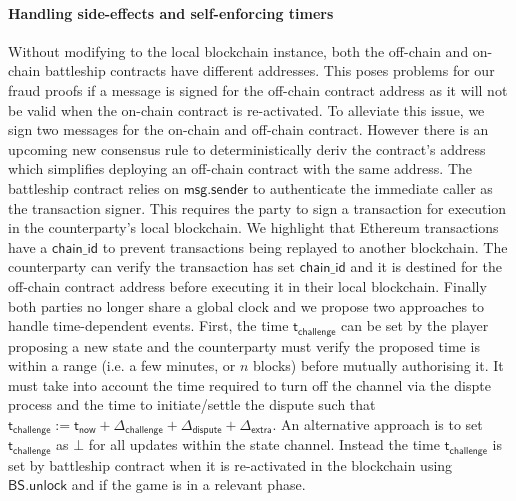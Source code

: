 \documentclass{llncs}
\newcommand{\battleshipunlock}{\mathsf{BS.unlock}}
\newcommand{\appcontract}{\mathsf{AC}}
\newcommand{\timerchallenge}{\mathsf{\Delta}_{\mathsf{challenge}}}
\newcommand{\timechallenge}{\mathsf{t}_{\mathsf{challenge}}}
\newcommand{\timerextra}{\mathsf{\Delta}_{\mathsf{extra}}}
\newcommand{\timerdispute}{\mathsf{\Delta}_{\mathsf{dispute}}}
\newcommand{\timenow}{\mathsf{t}_{\mathsf{now}}}
\begin{document}
	\paragraph{Handling side-effects and self-enforcing  timers} \label{sec:sideffectshandle}
	Without modifying to the local blockchain instance, both the off-chain and on-chain battleship contracts have different addresses.
	This poses problems for our fraud proofs if a message is signed for the off-chain contract address as it will not be valid when the on-chain contract is re-activated.
	To alleviate this issue, we sign two messages for the on-chain and off-chain contract.
	However there is an upcoming new consensus rule  \cite{eip1014} to deterministically deriv the contract's address which simplifies deploying an off-chain contract with the same address. 
	The battleship contract relies on $\mathsf{msg.sender}$ to authenticate the immediate caller as the transaction signer.
	This requires the party to sign a transaction for execution in the counterparty's local blockchain. 
	We highlight that Ethereum transactions have a $\mathsf{chain\_id}$ to prevent transactions being replayed to another blockchain.
	The counterparty can verify the transaction has set  $\mathsf{chain\_id}$  and it is destined for the off-chain contract address before executing it in their local blockchain. 
	Finally both parties no longer share a global clock and we propose two approaches to handle time-dependent events. 
	First, the time $\timechallenge$ can be set by the player proposing a new state and the counterparty must verify the proposed time is within a range (i.e. a few minutes, or $n$ blocks) before mutually authorising it.
	It must take into account the time required to turn off the channel via the dispte process and the time to initiate/settle the dispute such that $\timechallenge := \timenow + \timerchallenge + \timerdispute + \timerextra$. 
	An alternative approach is to set $\timechallenge$ as $\bot$ for all updates within the state channel. 
	Instead the time $\timechallenge$ is set by battleship contract when it is re-activated in the blockchain using $\battleshipunlock$ and if the game is in a relevant phase.
	
\end{document}
